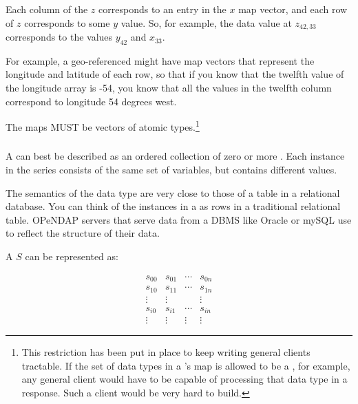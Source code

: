 \documentclass[justify]{nasa-ese}
\begin{document}
Each column of the $z$ \Array corresponds to an entry in the $x$ map vector,
and each row of $z$ corresponds to some $y$ value. So, for example, the data
value at $z_{42,33}$ corresponds to the values $y_{42}$ and $x_{33}$.

For example, a geo-referenced \Grid might have map vectors that
represent the longitude and latitude of each row, so that if you know
that the twelfth value of the longitude array is -54, you know that
all the values in the twelfth column correspond to longitude 54
degrees west.




The maps MUST be vectors of atomic types.\footnote{This restriction has been
put in place to keep writing general clients tractable. If the set of data
types in a \Grid's map \Arrays is allowed to be a \Sequence, for example, any
general client would have to be capable of processing that data type in a
response. Such a client would be very hard to build.}

\subsubsection{\Sequence}
\label{sec-constructor-sequence}

A \Sequence can best be described as an ordered collection of zero or more
\Structures. Each instance in the series consists of the same set of
variables, but contains different values.

The semantics of the \Sequence data type are very close to those of a table
in a relational database. You can think of the instances in a \Sequence as
rows in a traditional relational table. OPeNDAP servers that serve data from
a DBMS like Oracle or mySQL use \Sequences to reflect the structure of their
data.

A \Sequence $S$ can be represented as:

\begin{displaymath}
  \begin{array}{cccc}
    s_{0 0} & s_{0 1} & \cdots & s_{0 n} \\
    s_{1 0} & s_{1 1} & \cdots & s_{1 n} \\
    \vdots & \vdots  &         & \vdots \\
    s_{i 0} & s_{i 1} & \cdots & s_{i n} \\
    \vdots & \vdots  & \vdots & \vdots
  \end{array}
\end{displaymath}
\end{document}

